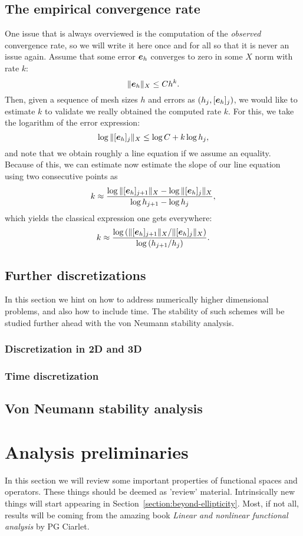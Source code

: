 \documentclass{article}
\renewcommand{\vec}{\vectorsym}
\begin{document}
\subsection{The empirical convergence rate}
One issue that is always overviewed is the computation of the \emph{observed} convergence rate, so we will write it here once and for all so that it is never an issue again. Assume that some error $\vec e_h$ converges to zero in some $X$ norm with rate $k$:
    $$ \|\vec e_h\|_X \leq C h^k.$$
    Then, given a sequence of mesh sizes $h$ and errors as $(h_j, [\vec e_h]_j)$, we would like to estimate $k$ to validate we really obtained the computed rate $k$. For this, we take the logarithm of the error expression:
    $$ \log \|[\vec e_h]_j\|_X \leq \log C + k \log h_j, $$
and note that we obtain roughly a line equation if we assume an equality. Because of this, we can estimate now estimate the slope of our line equation using two consecutive points as
$$ k \approx \frac{\log \|[\vec e_h]_{j+1}\|_X - \log \|[\vec e_h]_j\|_X}{ \log h_{j+1} - \log h_j}, $$
which yields the classical expression one gets everywhere: 
    $$ k \approx  \frac{\log \left(\|[\vec e_h]_{j+1}\|_X / \|[\vec e_h]_j\|_X\right)}{ \log \left(h_{j+1} / h_j\right)}. $$

\subsection{Further discretizations}
In this section we hint on how to address numerically higher dimensional problems, and also how to include time. The stability of such schemes will be studied further ahead with the von Neumann stability analysis. 
\subsubsection{Discretization in 2D and 3D}
\subsubsection{Time discretization}
\subsection{Von Neumann stability analysis}

\section{Analysis preliminaries}
In this section we will review some important properties of functional spaces and operators. These things should be deemed as 'review' material. Intrinsically new things will start appearing in Section~\ref{section:beyond-ellipticity}. Most, if not all, results will be coming from the amazing book \emph{Linear and nonlinear functional analysis} by PG Ciarlet.
\end{document}
